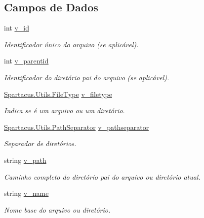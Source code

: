 \subsection*{Campos de Dados}
\begin{DoxyCompactItemize}
\item 
int \hyperlink{classSpartacus_1_1Utils_1_1File_a17bc6165cc938a4f490025290945a6e3}{v\+\_\+id}
\begin{DoxyCompactList}\small\item\em Identificador único do arquivo (se aplicável). \end{DoxyCompactList}\item 
int \hyperlink{classSpartacus_1_1Utils_1_1File_a645b1c73f5a3bac42a4ceb6fc1bdb06b}{v\+\_\+parentid}
\begin{DoxyCompactList}\small\item\em Identificador do diretório pai do arquivo (se aplicável). \end{DoxyCompactList}\item 
\hyperlink{namespaceSpartacus_1_1Utils_a2bc44488e88db523cb2dcffaa6e77541}{Spartacus.\+Utils.\+File\+Type} \hyperlink{classSpartacus_1_1Utils_1_1File_ab7b8ce972a88dde2ffab4ad63c4cc637}{v\+\_\+filetype}
\begin{DoxyCompactList}\small\item\em Indica se é um arquivo ou um diretório. \end{DoxyCompactList}\item 
\hyperlink{namespaceSpartacus_1_1Utils_a9ee24558a33d60b42674bae3eed2a094}{Spartacus.\+Utils.\+Path\+Separator} \hyperlink{classSpartacus_1_1Utils_1_1File_a45f2a42a093161cbe318734f67264294}{v\+\_\+pathseparator}
\begin{DoxyCompactList}\small\item\em Separador de diretórios. \end{DoxyCompactList}\item 
string \hyperlink{classSpartacus_1_1Utils_1_1File_a8f91c323ee7ab05e66c18d2006a6569a}{v\+\_\+path}
\begin{DoxyCompactList}\small\item\em Caminho completo do diretório pai do arquivo ou diretório atual. \end{DoxyCompactList}\item 
string \hyperlink{classSpartacus_1_1Utils_1_1File_a080b095e2b7aa8e1e6afaeff1ab8f453}{v\+\_\+name}
\begin{DoxyCompactList}\small\item\em Nome base do arquivo ou diretório. \end{DoxyCompactList}\item 

\end{DoxyCompactItemize}
